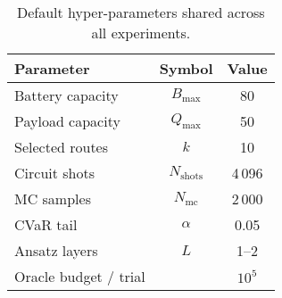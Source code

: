 \begin{table}[H]
\centering
\begin{tabular}{lcc}
\toprule
Parameter & Symbol & Value \\
\midrule
Battery capacity & $B_{\max}$ & 80 \\
Payload capacity & $Q_{\max}$ & 50 \\
Selected routes & $k$ & 10 \\
Circuit shots & $N_{\text{shots}}$ & 4\,096 \\
MC samples & $N_{\text{mc}}$ & 2\,000 \\
CVaR tail & $\alpha$ & 0.05 \\
Ansatz layers & $L$ & 1–2 \\
Oracle budget / trial &  & $10^{5}$ \\
\bottomrule
\end{tabular}
\caption{Default hyper-parameters shared across all experiments.}
\end{table}